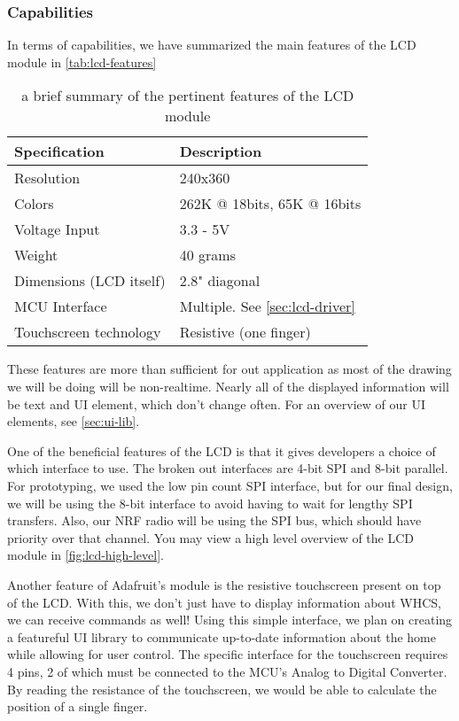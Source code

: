 
\subsubsection{Capabilities}
In terms of capabilities, we have summarized the main features of the LCD module in \autoref{tab:lcd-features}

\begin{table}[H]
\centering
\begin{tabular}{|l|l|}
\hline
\bfseries Specification & \bfseries Description \\ \hline
Resolution & 240x360 \\ \hline
Colors & 262K @ 18bits, 65K @ 16bits \\ \hline
Voltage Input & 3.3 - 5V \\ \hline
Weight & 40 grams \\ \hline
Dimensions (LCD itself) & 2.8" diagonal \\ \hline
MCU Interface & Multiple. See \autoref{sec:lcd-driver}\\ \hline
Touchscreen technology & Resistive (one finger)\\
\hline
\end{tabular}
\caption{a brief summary of the pertinent features of the LCD module}
\label{tab:lcd-features}
\end{table}

These features are more than sufficient for out application as most of the
drawing we will be doing will be non-realtime. Nearly all of the displayed
information will be text and UI element, which don't change often. For an
overview of our UI elements, see \autoref{sec:ui-lib}.

One of the beneficial features of the LCD is that it gives developers a choice
of which interface to use. The broken out interfaces are 4-bit SPI and 8-bit
parallel. For prototyping, we used the low pin count SPI interface, but for our
final design, we will be using the 8-bit interface to avoid having to wait for
lengthy SPI transfers. Also, our NRF radio will be using the SPI bus, which
should have priority over that channel. You may view a high level overview of
the LCD module in \autoref{fig:lcd-high-level}.


Another feature of Adafruit's module is the resistive touchscreen present on top of the
LCD. With this, we don't just have to display information about WHCS, we can
receive commands as well! Using this simple interface, we plan on creating a
featureful UI library to communicate up-to-date information about the home
while allowing for user control. The specific interface for the touchscreen
requires 4 pins, 2 of which must be connected to the MCU's Analog to Digital
Converter. By reading the resistance of the touchscreen, we would be able to
calculate the position of a single finger.

